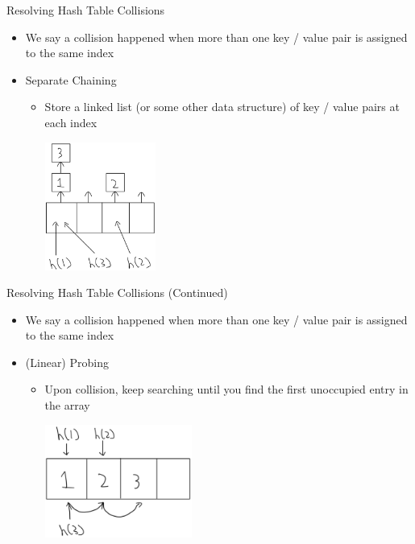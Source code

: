\documentclass[aspectratio=169]{beamer}
\begin{document}
\begin{frame}{Resolving Hash Table Collisions}
    \begin{itemize}
        \item We say a collision happened when more than one key / value pair is assigned to the same index
        \item Separate Chaining
        \begin{itemize}
            \item Store a linked list (or some other data structure) of key / value pairs at each index
            \begin{center}
                \includegraphics[width=0.3\textwidth]{images/sep_chain.png}
            \end{center}
        \end{itemize}
    \end{itemize}
\end{frame}

\begin{frame}{Resolving Hash Table Collisions (Continued)}
    \begin{itemize}
        \item We say a collision happened when more than one key / value pair is assigned to the same index
        \item (Linear) Probing
        \begin{itemize}
            \item Upon collision, keep searching until you find the first unoccupied entry in the array
            \begin{center}
                \includegraphics[width=0.4\textwidth]{images/lin_probe.png}
            \end{center}
        \end{itemize}
    \end{itemize}
\end{frame}
\end{document}
